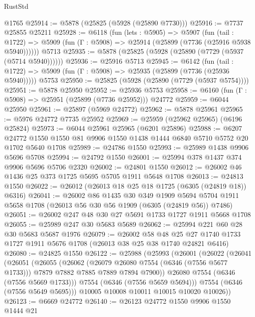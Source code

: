 \begin{lexlean}{RustStd}
\begin{coremodule}
    @1765
@25914 := @5878 (@25825 (@5928 (@25890 @7730)))
@25916 := @7737 @25855 @25211
@25928 := @6118
    (fun (lets : @5905) =>
    @5907
      (fun (tail : @1722) =>
      @5909 (fun (Γ : @5908) => @25914 (@25899 (@7736 (@25916 @5938 @5940))))))
    @5713
@25935 := @5878 (@25825 (@5928 (@25890 (@7729 (@5937 (@5714 @5940))))))
@25936 := @25916 @5713
@25945 := @6142
    (fun (tail : @1722) => @5909 (fun (Γ : @5908) => @25935 (@25899 (@7736 (@25936 @5940)))))
    @5753
@25950 := @25825 (@5928 (@25890 (@7729 (@5937 @5754))))
@25951 := @5878 @25950
@25952 := @25936 @5753
@25958 := @6160 (fun (Γ : @5908) => @25951 (@25899 (@7736 @25952))) @24772
@25959 := @6044 @25950
@25961 := @25897 (@5969 @24772)
@25962 := @5878 @25961
@25965 := @5976 @24772 @7735 @25952
@25969 := @25959 (@25962 @25965) (@6196 @25824)
@25973 := @6044 @25961 @25965 (@6201 @25896)
@25988 := @6207
    @24772
    @1550
    @1550
    @81
    @9906
    @1550
    @1438
    @1444
    @6840
    @5710
    @5752
    @20
    @1702
    @5640
    @1708
@25989 := @24786 @1550
@25993 := @25989 @1438 @9906 @5696 @5708
@25994 := @24792 @1550
@26001 := @25994 @378 @1437 @374 @9906 @5696 @5706 @2320
@26002 := @24801 @1550
@26012 := @26002 @46 @1436 @25 @373 @1725 @5695 @5705 @1911 @5648 @1708
@26013 := @24813 @1550
@26022 := @26012 (@26013 @18 @25 @18 @1725 (@6305 (@24819 @18)) @6316)
@26041 := @26002
    @86
    @1435
    @30
    @349
    @1909
    @5694
    @5704
    @1911
    @5658
    @1708
    (@26013 @56 @30 @56 @1909 (@6305 (@24819 @56)) @7486)
@26051 := @26002 @247 @48 @30 @27 @5691 @1733 @1727 @1911 @5668 @1708
@26055 := @25989 @247 @30 @5683 @5689
@26062 := @25994 @221 @60 @28 @30 @5683 @5687 @1976
@26079 := @26002
    @58
    @48
    @25
    @27
    @1740
    @1733
    @1727
    @1911
    @5676
    @1708
    (@26013 @38 @25 @38 @1740 @24821 @6416)
@26080 := @24825 @1550
@26122 := @25988
    (@25993
      (@26001
        (@26022
          (@26041
            (@26051
              (@26055
                (@26062
                  (@26079 @26080 @7554 (@6346 (@7556 @5677 @1733)))
                  @7879
                  @7882
                  @7885
                  @7889
                  @7894
                  @7900))
              @26080
              @7554
              (@6346 (@7556 @5669 @1733)))
            @7554
            (@6346 (@7556 @5659 @5694)))
          @7554
          (@6346 (@7556 @5649 @5695)))
        @10005
        @10008
        @10011
        @10015
        @10020
        @10026))
@26123 := @6669 @24772
@26140 := @26123
    @24772
    @1550
    @9906
    @1550
    @1444
    @21

\end{coremodule}
\end{lexlean}
